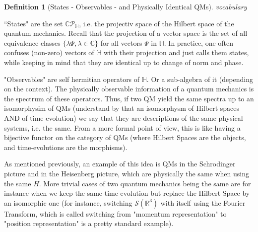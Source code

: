 \documentclass[a4paper,11pt]{article}
\numberwithin{equation}{section}
\theoremstyle{definition}
\newtheorem{definition}{Definition}
\begin{document}
\begin{definition}[States - Observables - and Physically Identical QMs] \emph{vocabulary}


``States" are the set $\mathbb{C}\mathcal{P}_\mathbb{H}$, i.e. the projectiv space of the Hilbert space of the quantum mechanics. Recall that the projection of a vector space is the set of all equivalence classes $\{\lambda \Psi, \lambda\in\mathbb{C}\}$ for all vectors $\Psi$ in $\mathbb{H}$. In practice, one often confuses (non-zero) vectors of $\mathbb{H}$ with their projection and just calls them states, while keeping in mind that they are identical up to change of norm and phase.

"Observables" are self hermitian operators of $\mathbb{H}$. Or a sub-algebra of it (depending on the context). The physically observable information of a quantum mechanics is the spectrum of these operators. Thus, if two QM yield the same spectra up to an isomorphysim of QMs (understand by that an isomorphysm of Hilbert spaces AND of time evolution) we say that they are descriptions of the same physical systems, i.e. the same. From a more formal point of view, this is like having a bijective functor on the category of QMs (where Hilbert Spaces are the objects, and time-evolutions are the morphisms).

As mentioned previously, an example of this idea is QMs in the Schrodinger picture and in the Heisenberg picture, which are physically the same when using the same $H$. More trivial cases of two quantum mechanics being the same are for instance when we keep the same time-evolution but replace the Hilbert Space by an isomorphic one (for instance, switching $\mathcal{S}(\mathbb{R}^3)$ with itself using the Fourier Transform, which is called switching from "momentum representation" to "position representation" is a pretty standard example).    
\end{definition}
\end{document}
